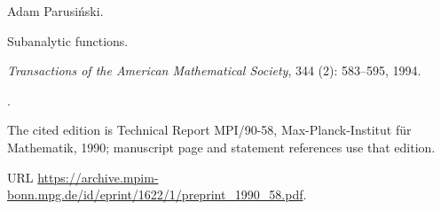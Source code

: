 Adam Parusi{\'n}ski.

\newblock Subanalytic functions.

\newblock \emph{Transactions of the American Mathematical Society},
  344 (2): 583--595, 1994.

\newblock {}.

\newblock The cited edition is Technical Report MPI/90-58,
  Max-Planck-Institut f{\"u}r Mathematik, 1990; manuscript page and statement
  references use that edition.

\newblock URL
  \url{https://archive.mpim-bonn.mpg.de/id/eprint/1622/1/preprint_1990_58.pdf}.
